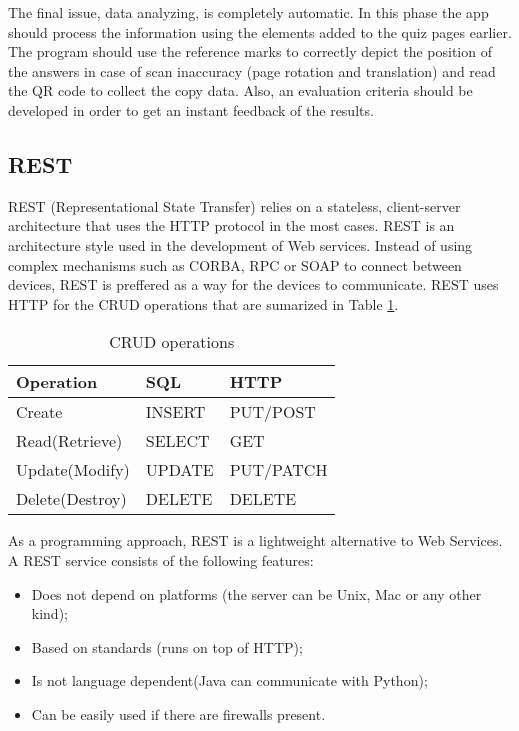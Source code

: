 The final issue, data analyzing, is completely automatic. In this phase the app should process 
the information using the elements added to the quiz pages earlier. The program should use the 
reference marks to correctly depict the position of the answers in case of scan inaccuracy (page rotation and translation) and read the QR code to collect the copy data. Also, an evaluation criteria should be developed 
in order to get an instant feedback of the results.

\subsection{REST}
REST (Representational State Transfer) relies on a stateless, client-server architecture that uses the HTTP protocol in the most cases.
REST is an architecture style used in the development of Web services. Instead of using complex mechanisms such as CORBA, RPC or SOAP to connect between devices, REST is preffered as a way for the devices to communicate.
REST uses HTTP for the CRUD operations that are sumarized in Table \ref{crud_operations}.
\begin{table}[ht!]
\centering
\caption{CRUD operations}
{
\renewcommand{\arraystretch}{1.25}
\begin{tabular}{ lll }

  Operation & SQL & HTTP \\ \hline
  Create &  INSERT & PUT/POST \\
  Read(Retrieve) & SELECT & GET \\
  Update(Modify) & UPDATE & PUT/PATCH \\
  Delete(Destroy) & DELETE & DELETE \\

\end{tabular}
}
\label{crud_operations}
\end{table}

As a programming approach, REST is a lightweight alternative to Web Services.
A REST service consists of the following features:
\begin{itemize}
  \item Does not depend on platforms (the server can be Unix, Mac or any other kind);
  \item Based on standards (runs on top of HTTP);
  \item Is not language dependent(Java can communicate with Python);
  \item Can be easily used if there are firewalls present.
\end{itemize}

